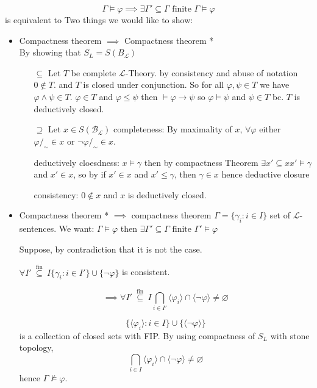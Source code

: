 \[\Gamma \models \varphi \implies \exists \Gamma'\subseteq \Gamma \text{ finite } \Gamma\models \varphi\]
is equivalent to 
Two things we would like to show:
\begin{itemize}
    \item Compactness theorem $\implies$ Compactness theorem *\\
    By showing that $S_L=S(B_\mathcal{L})$
    \begin{claimproof}
        \begin{itemize}
            \item[$\subseteq$] Let $T$ be complete $\mathcal{L}$-Theory. by consistency and abuse of notation $0\notin T$. and $T$ is closed under conjunction.
            So for all $\varphi,\psi\in T$ we have $\varphi\land\psi\in T$.
            $\varphi\in T$ and $\varphi\leq \psi$ then $\models \varphi\to \psi$ so $\varphi\models \psi$ and $\psi\in T$ bc. $T$ is deductively closed.
            \item[$\supseteq$] Let $x\in S(\mathcal{B}_\mathcal{L})$ 
            completeness: By maximality of $x$, $\forall \varphi$ either $\varphi/_\sim \in x$ or $\lnot \varphi/_\sim\in x$.

            deductively cloesdness: $x\models \gamma$ then by compactness Theorem $\exists x'\subseteq x x'\models \gamma$ and $x'\in x$, so by if $x'\in x$ and $x'\leq \gamma$, then $\gamma\in x$ hence deductive closure

            consistency: $0\notin x$ and $x$ is deductively closed.
        \end{itemize}
    \end{claimproof}
    \item Compactness theorem * $\implies$ compactness theorem
    $\Gamma = \{\gamma_i : i\in I\}$ set of $\mathcal{L}$-sentences.
    We want: $\Gamma\models \varphi$ then $\exists \Gamma'\subseteq \Gamma \text{ finite } \Gamma'\models \varphi$

    \begin{claimproof}
        Suppose, by contradiction that it is not the case.

        $\forall I'\stackrel{\text{ fin }}{\subseteq} I \{\gamma_i : i\in I'\}\cup \{\lnot \varphi\}$ is consistent.

        \[\implies \forall I'\stackrel{\text{ fin }}{\subseteq} I \bigcap_{i\in I'} \langle\varphi_i\rangle\cap \langle\lnot \varphi\rangle \neq \varnothing\]

        \[\{\langle\varphi_i\rangle : i\in I\}\cup \{ \langle\lnot \varphi\rangle \}\]
        is a collection of closed sets with FIP.
        By using compactness of $S_L$ with stone topology,
        \[\bigcap_{i\in I} \langle\varphi_i\rangle\cap \langle\lnot \varphi\rangle \neq \varnothing\]
        hence $\Gamma \not\models \varphi$.
    \end{claimproof}

\end{itemize}





